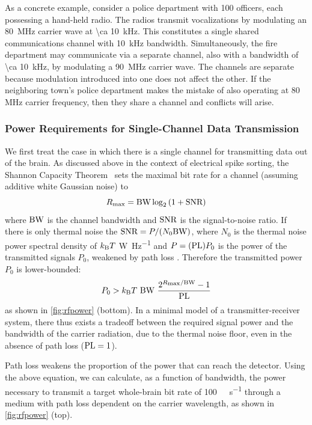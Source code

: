 As a concrete example, consider a police department with \num{100} officers, each possessing a hand-held radio.
The radios transmit vocalizations by modulating an \SI{80}{\mega\hertz} carrier wave at \SI{\ca 10}{\kilo\hertz}.
This constitutes a single shared communications channel with \SI{10}{\kilo\hertz} bandwidth.
Simultaneously, the fire department may communicate via a separate channel, also with a bandwidth of \SI{\ca 10}{\kilo\hertz}, by modulating a \SI{90}{\mega\hertz} carrier wave.
The channels are separate because modulation introduced into one does not affect the other.
If the neighboring town's police department makes the mistake of also operating at 80 MHz carrier frequency, then they share a channel and conflicts will arise.

\subsubsection{Power Requirements for Single-Channel Data Transmission}

We first treat the case in which there is a single channel for transmitting data out of the brain. As discussed above in the context of electrical spike sorting, the Shannon Capacity Theorem~\cite{cover06} sets the maximal bit rate for a channel (assuming additive white Gaussian noise) to
\[R_{\text{\scriptsize max}} = \text{BW} \log_2 \left(1 + \text{SNR}\right)\]
where $\text{BW}$ is the channel bandwidth and $\text{SNR}$ is the signal-to-noise ratio.
If there is only thermal noise the $\text{SNR} = P/(N_0 \text{BW})$, where $N_0$ is the thermal noise power spectral density of $k_{\text{\scriptsize B}} T$ \si{\watt\per\hertz} and $P=(\text{PL})P_0$ is the power of the transmitted signals $P_0$, weakened by path loss \pathloss.
Therefore the transmitted power $P_0$ is lower-bounded:
\[P_0 > \kb T\ \BW\ \frac{2^{R\sub{max}/\BW}-1}{\pathloss}\]
as shown in \autoref{fig:rfpower} (bottom).
In a minimal model of a transmitter-receiver system, there thus exists a tradeoff between the required signal power and the bandwidth of the carrier radiation, due to the thermal noise floor, even in the absence of path loss ($\text{PL} = 1$).

Path loss weakens the proportion of the power that can reach the detector.
Using the above equation, we can calculate, as a function of bandwidth, the power necessary to transmit a target whole-brain bit rate of \SI{100}{\giga\bit\per\second} through a medium with path loss dependent on the carrier wavelength, as shown in \autoref{fig:rfpower} (top).

